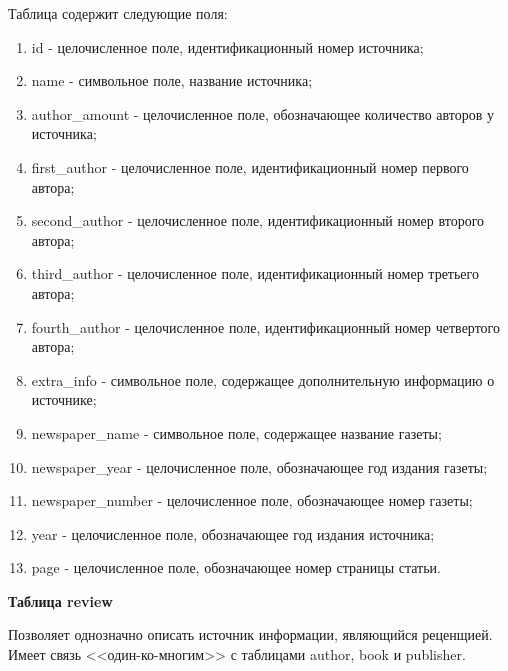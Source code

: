 Таблица содержит следующие поля:
\begin{enumerate}
	\item id - целочисленное поле, идентификационный номер источника;
	\item name - символьное поле, название источника;
	\item author\_amount - целочисленное поле, обозначающее количество авторов у источника;
	\item first\_author - целочисленное поле, идентификационный номер первого автора;
	\item second\_author - целочисленное поле, идентификационный номер второго автора;
	\item third\_author - целочисленное поле, идентификационный номер третьего автора;
	\item fourth\_author - целочисленное поле, идентификационный номер четвертого автора;
	\item extra\_info - символьное поле, содержащее дополнительную информацию о источнике;
	\item newspaper\_name - символьное поле, содержащее название газеты;
	\item newspaper\_year - целочисленное поле, обозначающее год издания газеты;
	\item newspaper\_number - целочисленное поле, обозначающее номер газеты;
	\item year - целочисленное поле, обозначающее год издания источника;
	\item page - целочисленное поле, обозначающее номер страницы статьи.
\end{enumerate}

\hfill \break

{\bf Таблица review}

Позволяет однозначно описать источник информации, являющийся  реценщией. Имеет связь <<один-ко-многим>> с таблицами author, book и publisher. 


